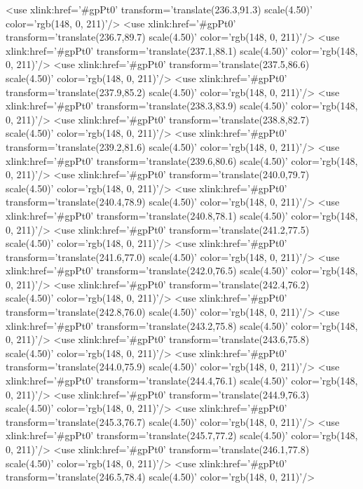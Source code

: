 	<use xlink:href='#gpPt0' transform='translate(236.3,91.3) scale(4.50)' color='rgb(148,   0, 211)'/>
	<use xlink:href='#gpPt0' transform='translate(236.7,89.7) scale(4.50)' color='rgb(148,   0, 211)'/>
	<use xlink:href='#gpPt0' transform='translate(237.1,88.1) scale(4.50)' color='rgb(148,   0, 211)'/>
	<use xlink:href='#gpPt0' transform='translate(237.5,86.6) scale(4.50)' color='rgb(148,   0, 211)'/>
	<use xlink:href='#gpPt0' transform='translate(237.9,85.2) scale(4.50)' color='rgb(148,   0, 211)'/>
	<use xlink:href='#gpPt0' transform='translate(238.3,83.9) scale(4.50)' color='rgb(148,   0, 211)'/>
	<use xlink:href='#gpPt0' transform='translate(238.8,82.7) scale(4.50)' color='rgb(148,   0, 211)'/>
	<use xlink:href='#gpPt0' transform='translate(239.2,81.6) scale(4.50)' color='rgb(148,   0, 211)'/>
	<use xlink:href='#gpPt0' transform='translate(239.6,80.6) scale(4.50)' color='rgb(148,   0, 211)'/>
	<use xlink:href='#gpPt0' transform='translate(240.0,79.7) scale(4.50)' color='rgb(148,   0, 211)'/>
	<use xlink:href='#gpPt0' transform='translate(240.4,78.9) scale(4.50)' color='rgb(148,   0, 211)'/>
	<use xlink:href='#gpPt0' transform='translate(240.8,78.1) scale(4.50)' color='rgb(148,   0, 211)'/>
	<use xlink:href='#gpPt0' transform='translate(241.2,77.5) scale(4.50)' color='rgb(148,   0, 211)'/>
	<use xlink:href='#gpPt0' transform='translate(241.6,77.0) scale(4.50)' color='rgb(148,   0, 211)'/>
	<use xlink:href='#gpPt0' transform='translate(242.0,76.5) scale(4.50)' color='rgb(148,   0, 211)'/>
	<use xlink:href='#gpPt0' transform='translate(242.4,76.2) scale(4.50)' color='rgb(148,   0, 211)'/>
	<use xlink:href='#gpPt0' transform='translate(242.8,76.0) scale(4.50)' color='rgb(148,   0, 211)'/>
	<use xlink:href='#gpPt0' transform='translate(243.2,75.8) scale(4.50)' color='rgb(148,   0, 211)'/>
	<use xlink:href='#gpPt0' transform='translate(243.6,75.8) scale(4.50)' color='rgb(148,   0, 211)'/>
	<use xlink:href='#gpPt0' transform='translate(244.0,75.9) scale(4.50)' color='rgb(148,   0, 211)'/>
	<use xlink:href='#gpPt0' transform='translate(244.4,76.1) scale(4.50)' color='rgb(148,   0, 211)'/>
	<use xlink:href='#gpPt0' transform='translate(244.9,76.3) scale(4.50)' color='rgb(148,   0, 211)'/>
	<use xlink:href='#gpPt0' transform='translate(245.3,76.7) scale(4.50)' color='rgb(148,   0, 211)'/>
	<use xlink:href='#gpPt0' transform='translate(245.7,77.2) scale(4.50)' color='rgb(148,   0, 211)'/>
	<use xlink:href='#gpPt0' transform='translate(246.1,77.8) scale(4.50)' color='rgb(148,   0, 211)'/>
	<use xlink:href='#gpPt0' transform='translate(246.5,78.4) scale(4.50)' color='rgb(148,   0, 211)'/>
